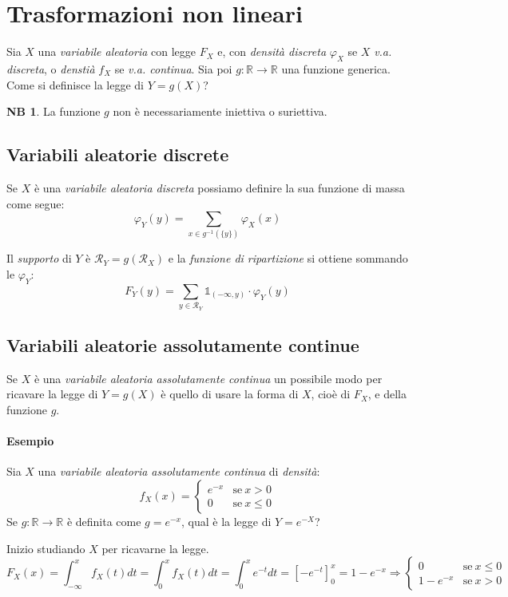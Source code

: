 \documentclass[12pt, a4paper]{report}
\theoremstyle{definition}
\newtheorem*{note}{NB}
\DeclareRobustCommand{\R}{\mathbb{R}}%
\DeclareRobustCommand{\supp}{\mathcal{R}}%
\DeclareRobustCommand{\one}{\mathds{1}}
\begin{document}
\section{Trasformazioni non lineari}
Sia $X$ una \emph{variabile aleatoria} con legge $F_X$ e, con \emph{densità
discreta} $\varphi_X$ se $X$ \emph{v.a. discreta}, o \emph{denstià} $f_X$ se
\emph{v.a. continua}. Sia poi $g:\R\rightarrow\R$ una funzione generica. Come si
definisce la legge di \(Y=g(X)\)?
\begin{note}
	La funzione $g$ non è necessariamente iniettiva o suriettiva.
\end{note}
\subsection{Variabili aleatorie discrete}
Se $X$ è una \emph{variabile aleatoria discreta} possiamo definire la sua funzione
di massa come segue:
\[\varphi_Y(y)=\sum_{x\in g^{-1}(\{y\})}\varphi_X(x)\]

Il \emph{supporto} di $Y$ è \(\supp_Y=g(\supp_X)\) e la \emph{funzione di
ripartizione} si ottiene sommando le $\varphi_Y$:
\[F_Y(y)=\sum_{y\in\supp_Y}\one_{(-\infty, y)}\cdot \varphi_Y(y)\]

\subsection{Variabili aleatorie assolutamente continue}
Se $X$ è una \emph{variabile aleatoria assolutamente continua} un possibile modo
per ricavare la legge di \(Y=g(X)\) è quello di usare la forma di $X$, cioè di $F_X$,
e della funzione $g$.

\paragraph*{Esempio}
Sia $X$ una \emph{variabile aleatoria assolutamente continua} di \emph{densità}:
\[f_X(x)=\begin{cases}
	{e^{-x}} & \text{se}\ {x>0}\\
	{0} & \text{se}\ {x\leq 0}
\end{cases}\]
Se \(g:\R\rightarrow\R\) è definita come \(g=e^{-x}\), qual è la legge di \(Y=e^{-X}\)?

Inizio studiando $X$ per ricavarne la legge.
\[F_X(x)=\int_{-\infty}^{x}f_X(t)dt=\int_{0}^{x}f_X(t)dt=\int_{0}^{x}e^{-t}dt=
[-e^{-t}]_{0}^{x}=1-e^{-x}\Rightarrow\begin{cases}
	{0} & \text{se}\ {x\leq 0}\\
	{1-e^{-x}} & \text{se}\ {x>0}
\end{cases}\]
\end{document}
